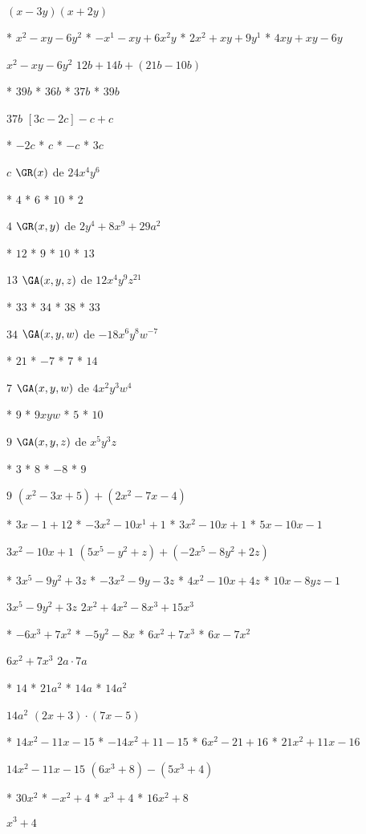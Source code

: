 $(x-3y)(x+2y)$
\begin{enum}
	* $x^2-xy-6y^2$
	* $-x^1-xy+6x^2y$
	* $2x^2+xy+9y^1$
	* $4xy+xy-6y$
\end{enum}
$x^2-xy-6y^2$
$12b+14b+(21b-10b)$
\begin{enum}
	* $39b$
	* $36b$
	* $37b$
	* $39b$
\end{enum}
$37b$
$[3c-2c]-c+c$
\begin{enum}
	* $-2c$
	* $c$
	* $-c$
	* $3c$
\end{enum}
$c$
$\GR(x)$ de $24x^4y^6$
\begin{enum}
	* $4$
	* $6$
	* $10$
	* $2$
\end{enum}
$4$
$\GR(x,y)$ de $2y^4+8x^9+29a^2$
\begin{enum}
	* $12$
	* $9$
	* $10$
	* $13$
\end{enum}
$13$
$\GA(x,y,z)$ de $12x^4y^9z^{21}$
\begin{enum}
	* $33$
	* $34$
	* $38$
	* $33$
\end{enum}
$34$
$\GA(x,y,w)$ de $-18x^6y^8w^{-7}$
\begin{enum}
	* $21$
	* $-7$
	* $7$
	* $14$
\end{enum}
$7$
$\GA(x,y,w)$ de $4x^2y^3w^4$
\begin{enum}
	* $9$
	* $9xyw$
	* $5$
	* $10$
\end{enum}
$9$
$\GA(x,y,z)$ de $x^5y^3z$
\begin{enum}
	* $3$
	* $8$
	* $-8$
	* $9$
\end{enum}
$9$
$\left(x^2-3x+5\right)+\left(2x^2-7x-4\right)$
\begin{enum}
	* $3x-1+12$
	* $-3x^2-10x^1+1$
	* $3x^2-10x+1$
	* $5x-10x-1$
\end{enum}
$3x^2-10x+1$
$\left(5x^5-y^2+z\right)+\left(-2x^5-8y^2+2z\right)$
\begin{enum}
	* $3x^5-9y^2+3z$
	* $-3x^2-9y-3z$
	* $4x^2-10x+4z$
	* $10x-8yz-1$
\end{enum}
$3x^5-9y^2+3z$
$2x^2+4x^2-8x^3+15x^3$
\begin{enum}
	* $-6x^3+7x^2$
	* $-5y^2-8x$
	* $6x^2+7x^3$
	* $6x-7x^2$
\end{enum}
$6x^2+7x^3$
$2a\cdot 7a$
\begin{enum}
	* $14$
	* $21a^2$
	* $14a$
	* $14a^2$
\end{enum}
$14a^2$
$(2x+3)\cdot(7x-5)$
\begin{enum}
	* $14x^2-11x-15$
	* $-14x^2+11-15$
	* $6x^2-21+16$
	* $21x^2+11x-16$
\end{enum}
$14x^2-11x-15$
$\left(6x^3+8\right)-\left(5x^3+4\right)$
\begin{enum}
	* $30x^2$
	* $-x^2+4$
	* $x^3+4$
	* $16x^2+8$
\end{enum}
$x^3+4$
